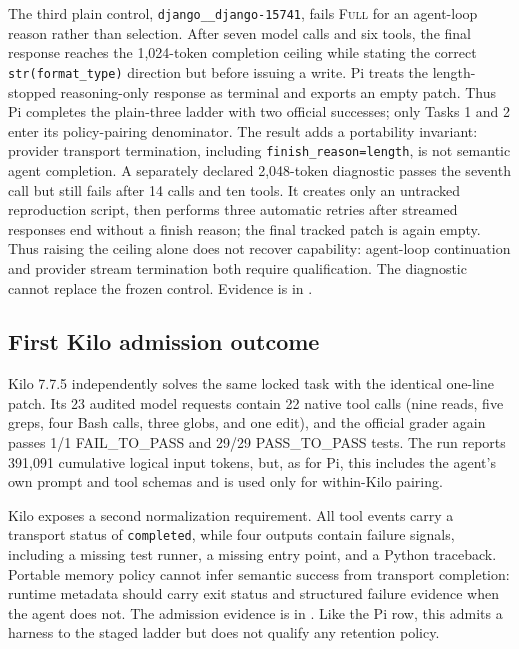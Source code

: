 \documentclass[11pt]{article}
\begin{document}
The third plain control, \texttt{django\_\_django-15741}, fails \textsc{Full}
for an agent-loop reason rather than selection.  After seven model calls and
six tools, the final response reaches the 1,024-token completion ceiling while
stating the correct \texttt{str(format\_type)} direction but before issuing a
write.  Pi treats the length-stopped reasoning-only response as terminal and
exports an empty patch.  Thus Pi completes the plain-three ladder with two
official successes; only Tasks 1 and 2 enter its policy-pairing denominator.
The result adds a portability invariant: provider transport termination,
including \texttt{finish\_reason=length}, is not semantic agent completion.
A separately declared 2,048-token diagnostic passes the seventh call but still
fails after 14 calls and ten tools.  It creates only an untracked reproduction
script, then performs three automatic retries after streamed responses end
without a finish reason; the final tracked patch is again empty.  Thus raising
the ceiling alone does not recover capability: agent-loop continuation and
provider stream termination both require qualification.  The diagnostic cannot
replace the frozen control.  Evidence is in
.

\subsection{First Kilo admission outcome}

Kilo 7.7.5 independently solves the same locked task with the identical
one-line patch.  Its 23 audited model requests contain 22 native tool calls
(nine reads, five greps, four Bash calls, three globs, and one edit), and the
official grader again passes 1/1 FAIL\_TO\_PASS and 29/29 PASS\_TO\_PASS tests.
The run reports 391,091 cumulative logical input tokens, but, as for Pi, this
includes the agent's own prompt and tool schemas and is used only for
within-Kilo pairing.

Kilo exposes a second normalization requirement.  All tool events carry a
transport status of \texttt{completed}, while four outputs contain failure
signals, including a missing test runner, a missing entry point, and a Python
traceback.  Portable memory policy cannot infer semantic success from transport
completion: runtime metadata should carry exit status and structured failure
evidence when the agent does not.  The admission evidence is in
.  Like the Pi row,
this admits a harness to the staged ladder but does not qualify any retention
policy.
\end{document}
